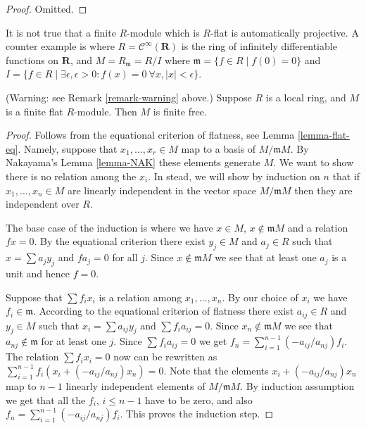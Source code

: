 \begin{proof}
Omitted.
\end{proof}

\begin{remark}
\label{remark-warning}
It is not true that a finite $R$-module which is
$R$-flat is automatically projective. A counter
example is where $R = \mathcal{C}^\infty(\mathbf{R})$
is the ring of infinitely differentiable functions on
$\mathbf{R}$, and $M = R_{\mathfrak m} = R/I$ where
$\mathfrak m = \{f \in R \mid f(0) = 0\}$ and
$I = \{f \in R \mid \exists \epsilon, \epsilon > 0 :
f(x) = 0\ \forall x, |x| < \epsilon\}$.
\end{remark}

\begin{lemma}
\label{lemma-finite-flat-local}
(Warning: see Remark \ref{remark-warning} above.)
Suppose $R$ is a local ring, and $M$ is a finite
flat $R$-module. Then $M$ is finite free.
\end{lemma}

\begin{proof}
Follows from the equational criterion of flatness, see
Lemma \ref{lemma-flat-eq}. Namely, suppose that
$x_1, \ldots, x_r \in M$ map to a basis of
$M/\mathfrak mM$. By Nakayama's Lemma \ref{lemma-NAK}
these elements generate $M$. We want to show there
is no relation among the $x_i$. In stead, we will show
by induction on $n$ that if $x_1, \ldots, x_n \in M$
are linearly independent in the vector space
$M/\mathfrak mM$ then they are independent over $R$.

\medskip\noindent
The base case of the induction is where we have
$x \in M$, $x \not\in \mathfrak mM$ and a relation
$fx = 0$. By the equational criterion there
exist $y_j \in M$ and $a_j \in R$ such that
$x = \sum a_j y_j$ and $fa_j = 0$ for all $j$.
Since $x \not\in \mathfrak mM$ we see that
at least one $a_j$ is a unit and hence $f = 0 $.

\medskip\noindent
Suppose that $\sum f_i x_i$ is a relation among $x_1, \ldots, x_n$.
By our choice of $x_i$ we have $f_i \in \mathfrak m$.
According to the equational criterion of flatness there exist
$a_{ij} \in R$ and $y_j \in M$ such that
$x_i = \sum a_{ij} y_j$ and $\sum f_i a_{ij} = 0$.
Since $x_n \not \in \mathfrak mM$ we see that
$a_{nj}\not\in \mathfrak m$ for at least one $j$.
Since $\sum f_i a_{ij} = 0$ we get
$f_n = \sum_{i = 1}^{n-1} (-a_{ij}/a_{nj}) f_i$.
The relation $\sum f_i x_i = 0$ now can be rewritten
as $\sum_{i = 1}^{n-1} f_i( x_i + (-a_{ij}/a_{nj}) x_n) = 0$.
Note that the elements $x_i + (-a_{ij}/a_{nj}) x_n$ map
to $n-1$ linearly independent elements of $M/\mathfrak mM$.
By induction assumption we get that all the $f_i$, $i \leq n-1$
have to be zero, and also $f_n = \sum_{i = 1}^{n-1} (-a_{ij}/a_{nj}) f_i$.
This proves the induction step.
\end{proof}

